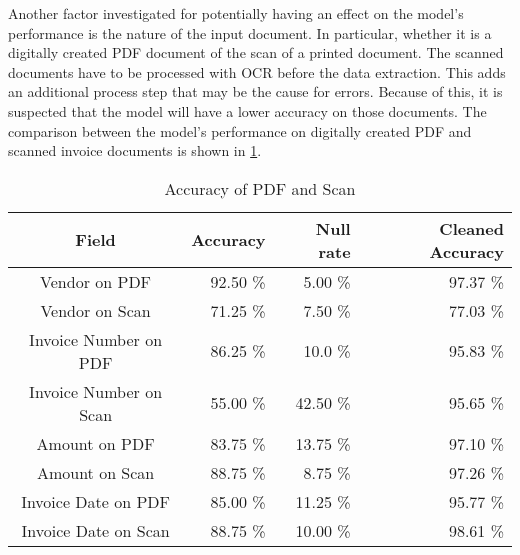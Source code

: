 Another factor investigated for potentially having an effect on the model's performance is the nature of the input document. In particular, whether it is a digitally created PDF document of the scan of a printed document. The scanned documents have to be processed with \ac{OCR} before the data extraction. This adds an additional process step that may be the cause for errors. Because of this, it is suspected that the model will have a lower accuracy on those documents. The comparison between the model's performance on digitally created PDF and scanned invoice documents is shown in \cref{table:Field_Com_Scan_PDF}.

\begin{table}[ht]   %
    \centering
    \footnotesize
    \begin{tabular}{c|rrr} %
        \toprule    %
        Field  & Accuracy  & Null rate & Cleaned Accuracy \\
        \midrule    %
        Vendor on PDF    & 92.50 \%   &  5.00 \%   & 97.37 \% \\
        Vendor on Scan   & 71.25 \%   &  7.50 \%   & 77.03 \% \\
        \midrule    %
        Invoice Number on PDF & 86.25 \%   & 10.0 \%  & 95.83 \%\\
        Invoice Number on Scan & 55.00 \%  & 42.50 \%  & 95.65 \%\\
        \midrule    %
        Amount on PDF      & 83.75 \%   & 13.75 \%  & 97.10 \% \\
        Amount on Scan     & 88.75 \%   & 8.75 \%  & 97.26 \% \\
        \midrule    %
        Invoice Date on PDF  & 85.00 \%   & 11.25  \%  & 95.77 \% \\
        Invoice Date on Scan & 88.75 \%   & 10.00  \%  & 98.61 \% \\
        
        \bottomrule %
    \end{tabular}
    \caption{Accuracy of PDF and Scan}
    \label{table:Field_Com_Scan_PDF}
\end{table}

